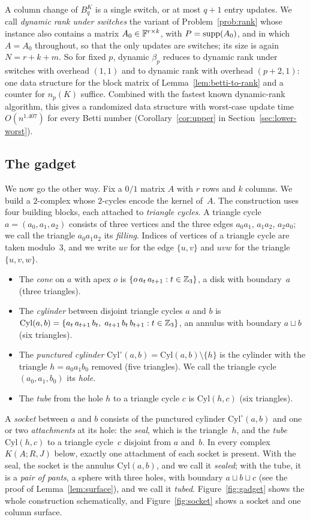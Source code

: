 A column change of $B_q^K$ is a single switch, or at most $q+1$ entry updates.
We call \emph{dynamic rank under switches} the variant of Problem~\ref{prob:rank} whose instance also contains a matrix $A_0\in\mathbb{F}^{r\times k}$, with $P=\operatorname{supp}(A_0)$, and in which $A=A_0$ throughout, so that the only updates are switches; its size is again $N=r+k+m$.
So for fixed $p$, dynamic $\beta_p$ reduces to dynamic rank under switches with overhead $(1,1)$ and to dynamic rank with overhead $(p+2,1)$: one data structure for the block matrix of Lemma~\ref{lem:betti-to-rank} and a counter for $n_p(K)$ suffice.
Combined with the fastest known dynamic-rank algorithm, this gives a randomized data structure with worst-case update time $O(n^{1.407})$ for every Betti number (Corollary~\ref{cor:upper} in Section~\ref{sec:lower-worst}).

\subsection{The gadget}\label{sec:gadget}

We now go the other way.
Fix a $0/1$ matrix $A$ with $r$ rows and $k$ columns.
We build a $2$-complex whose $2$-cycles encode the kernel of~$A$.
The construction uses four building blocks, each attached to \emph{triangle cycles}.
A triangle cycle $a=(a_0,a_1,a_2)$ consists of three vertices and the three edges $a_0a_1$, $a_1a_2$, $a_2a_0$; we call the triangle $a_0a_1a_2$ its \emph{filling}.
Indices of vertices of a triangle cycle are taken modulo~$3$, and we write $uv$ for the edge $\{u,v\}$ and $uvw$ for the triangle $\{u,v,w\}$.
\begin{itemize}
\item The \emph{cone} on $a$ with apex $o$ is $\{o\,a_t\,a_{t+1} : t\in\mathbb{Z}_3\}$, a disk with boundary~$a$ (three triangles).
\item The \emph{cylinder} between disjoint triangle cycles $a$ and $b$ is $\mathrm{Cyl}(a,b)=\{a_t\,a_{t+1}\,b_t,\; a_{t+1}\,b_t\,b_{t+1} : t\in\mathbb{Z}_3\}$, an annulus with boundary $a\sqcup b$ (six triangles).
\item The \emph{punctured cylinder} $\mathrm{Cyl}^{\circ}(a,b)=\mathrm{Cyl}(a,b)\setminus\{h\}$ is the cylinder with the triangle \mbox{$h=a_0a_1b_0$} removed (five triangles). We call the triangle cycle $(a_0,a_1,b_0)$ its \emph{hole}.
\item The \emph{tube} from the hole $h$ to a triangle cycle $c$ is $\mathrm{Cyl}(h,c)$ (six triangles).
\end{itemize}
A \emph{socket} between $a$ and $b$ consists of the punctured cylinder $\mathrm{Cyl}^{\circ}(a,b)$ and one or two \emph{attachments} at its hole: the \emph{seal}, which is the triangle~$h$, and the \emph{tube} $\mathrm{Cyl}(h,c)$ to a triangle cycle~$c$ disjoint from $a$ and~$b$.
In every complex $K(A;R,J)$ below, exactly one attachment of each socket is present.
With the seal, the socket is the annulus $\mathrm{Cyl}(a,b)$, and we call it \emph{sealed}; with the tube, it is a \emph{pair of pants}, a sphere with three holes, with boundary $a\sqcup b\sqcup c$ (see the proof of Lemma~\ref{lem:surface}), and we call it \emph{tubed}.
Figure~\ref{fig:gadget} shows the whole construction schematically, and Figure~\ref{fig:socket} shows a socket and one column surface.



